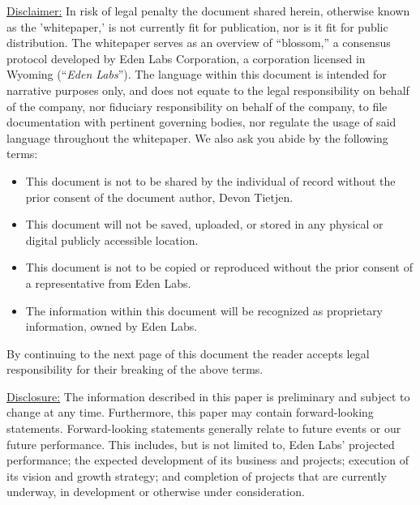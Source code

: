 \begin{flushleft}
    \fontsize{9.4}{9.4}\selectfont
    \underline{Disclaimer:} In risk of legal penalty the document shared herein, otherwise known as the 'whitepaper,' is not currently fit for publication, nor is it fit for public distribution. The whitepaper serves as an overview of “blossom,” a consensus protocol developed by Eden Labs Corporation, a corporation licensed in Wyoming (“\textit{Eden Labs}”). The language within this document is intended for narrative purposes only, and does not equate to the legal responsibility on behalf of the company, nor fiduciary responsibility on behalf of the company, to file documentation with pertinent governing bodies, nor regulate the usage of said language throughout the whitepaper. We also ask you abide by the following terms:
    \begin{itemize}
        \item This document is not to be shared by the individual of record without the prior consent of the document author, Devon Tietjen.
        \item This document will not be saved, uploaded, or stored in any physical or digital publicly accessible location.
        \item This document is not to be copied or reproduced without the prior consent of a representative from Eden Labs.
        \item The information within this document will be recognized as proprietary information, owned by Eden Labs.
    \end{itemize}
    By continuing to the next page of this document the reader accepts legal responsibility for their breaking of the above terms.

    \medskip
    
    \underline{Disclosure:} The information described in this paper is preliminary and subject to change at any time. Furthermore, this paper may contain forward-looking statements. Forward-looking statements generally relate to future events or our future performance. This includes, but is not limited to, Eden Labs’ projected performance; the expected development of its business and projects; execution of its vision and growth strategy; and completion of projects that are currently underway, in development or otherwise under consideration. 
    \medskip


\end{flushleft}
